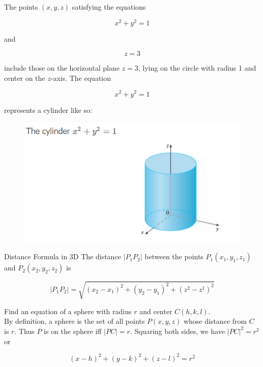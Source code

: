         \textit{} 
        The points $(x,y,z)$ satisfying the equations

        \[
            x^2 + y^2 = 1
        \]

        and

        \[
            z = 3
        \]

        include those on the horizontal plane $z=3$, lying on the circle with radius 1 and center on the $z$-axis. The equation

        \[
            x^2 + y^2 = 1
        \]

        represents a cylinder like so:

        \begin{figure}[hbt!]
            \centering
            \includegraphics[scale=0.75]{Resources/12.1_Cylinder}
        \end{figure}

        \begin{theorem}{Distance Formula in 3D}
            The distance $|P_1 P_2|$ between the points $P_1 (x_1, y_1, z_1)$ and $P_2 (x_2, y_2, z_2)$ is

            \[
                |P_1 P_2| = \sqrt{(x_2 - x_1)^2 + (y_2 - y_1)^2 + (z^2 - z^1)^2}
            \]
        \end{theorem}

        \textit{} Find an equation of a sphere with radius $r$ and center $C(h,k,l)$. \\

        By definition, a sphere is the set of all points $P(x,y,z)$ whose distance from $C$ is $r$. Thus $P$ is on the sphere iff $|PC|=r$. Squaring both sides, we have $|PC|^2 = r^2$ or

        \[
            (x-h)^2 + (y-k)^2 + (z-l)^2 = r^2
        \]

